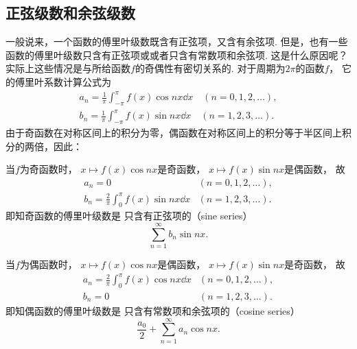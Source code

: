 \subsection{正弦级数和余弦级数}
一般说来，一个函数的傅里叶级数既含有正弦项，又含有余弦项.
但是，也有一些函数的傅里叶级数只含有正弦项或或者只含有常数项和余弦项.
这是什么原因呢？实际上这些情况是与所给函数\(f\)的奇偶性有密切关系的.
对于周期为\(2\pi\)的函数\(f\)，
它的傅里叶系数计算公式为\begin{gather*}
	a_n = \frac{1}{\pi} \int_{-\pi}^\pi f(x) \cos nx \dd{x} \quad(n=0,1,2,\dotsc), \\
	b_n = \frac{1}{\pi} \int_{-\pi}^\pi f(x) \sin nx \dd{x} \quad(n=1,2,3,\dotsc).
\end{gather*}
由于奇函数在对称区间上的积分为零，偶函数在对称区间上的积分等于半区间上积分的两倍，因此：

当\(f\)为奇函数时，
\(x \mapsto f(x) \cos nx\)是奇函数，
\(x \mapsto f(x) \sin nx\)是偶函数，
故\begin{equation*}
	\begin{array}{ll}
		a_n = 0 & (n=0,1,2,\dotsc), \\
		b_n = \frac{2}{\pi} \int_0^\pi f(x) \sin nx \dd{x} & (n=1,2,3,\dotsc).
	\end{array}
\end{equation*}
即知奇函数的傅里叶级数是
只含有正弦项的（sine series）\begin{equation*}
	\sum_{n=1}^\infty b_n \sin nx.
\end{equation*}

当\(f\)为偶函数时，
\(x \mapsto f(x) \cos nx\)是偶函数，
\(x \mapsto f(x) \sin nx\)是奇函数，
故\begin{equation*}
	\begin{array}{ll}
		a_n = \frac{2}{\pi} \int_0^\pi f(x) \cos nx \dd{x} & (n=0,1,2,\dotsc), \\
		b_n = 0 & (n=1,2,3,\dotsc).
	\end{array}
\end{equation*}
即知偶函数的傅里叶级数是
只含有常数项和余弦项的（cosine series）\begin{equation*}
	\frac{a_0}{2} + \sum_{n=1}^\infty a_n \cos{nx}.
\end{equation*}

